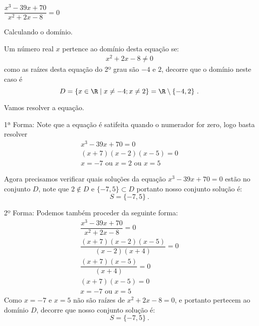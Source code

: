  \begin{exem} $\dfrac{x^3 -39x + 70}{x^2 + 2x - 8}= 0$
 
 Calculando o domínio. 
 
 Um número real $x$ pertence ao domínio desta equação se:
 \begin{eqnarray}
  x^2 + 2x - 8 \neq 0 
 \end{eqnarray}
 como as raízes desta equação do 2º grau são $-4$ e $2$, decorre que o domínio neste caso é
 \[D= \{ x \in \R \mid x \neq -4; x \neq 2 \}= \R \setminus \{-4, 2\} \ . \]
 
 Vamos resolver a equação.
 
 1ª Forma: Note que a equação é satifeita quando o numerador for zero, logo basta resolver
 \begin{eqnarray}
 x^3 -39x + 70= 0 \\
 (x+7)(x-2)(x-5)= 0 \\
 x= -7 \text{ ou } x= 2 \text{ ou } x= 5
 \end{eqnarray}
 
 Agora precisamos verificar quais soluções da equação $x^3 -39x + 70= 0$ estão no conjunto $D$, note que $2 \notin D$ e $\{-7, 5\} \subset D$ portanto nosso conjunto solução é:
 \[S= \{ -7, 5 \} \ . \]
 
 2º Forma: Podemos também proceder da seguinte forma:
 \begin{eqnarray}
 \dfrac{x^3 -39x + 70}{x^2 + 2x - 8}= 0 \\
 \dfrac{(x+7)(x-2)(x-5)}{(x-2)(x+4)}= 0 \\
 \dfrac{(x+7)(x-5)}{(x+4)}= 0 \\
 (x+7)(x-5)= 0 \\
 x= -7 \text{ ou } x= 5
 \end{eqnarray}
 Como $x= -7$ e $x= 5$ não são raízes de $x^2+2x-8=0$, e portanto pertecem ao domínio $D$, decorre que nosso conjunto solução é:
  \[S= \{ -7, 5 \} \ . \]
 \end{exem}
 
